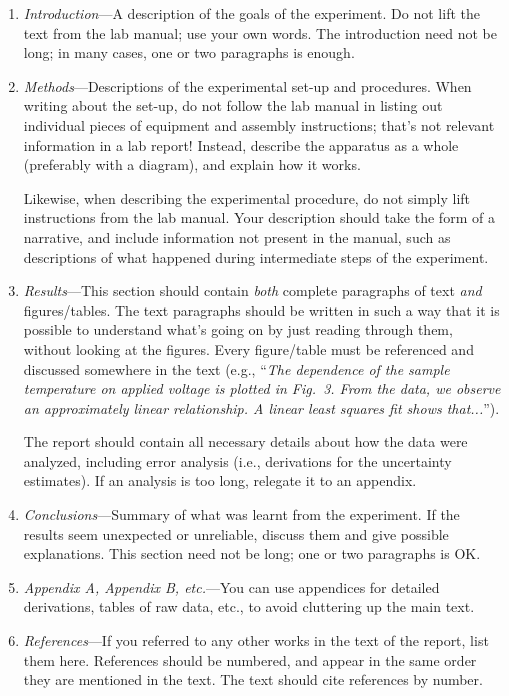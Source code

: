 \documentclass[11pt,a4paper]{article}
\begin{document}
\begin{enumerate}
\item \textit{Introduction}---A description of the goals of the
  experiment.  Do not lift the text from the lab manual; use your own
  words.  The introduction need not be long; in many cases, one or two
  paragraphs is enough.

\item \textit{Methods}---Descriptions of the experimental set-up and
  procedures.  When writing about the set-up, do not follow the lab
  manual in listing out individual pieces of equipment and assembly
  instructions; that's not relevant information in a lab report!
  Instead, describe the apparatus as a whole (preferably with a
  diagram), and explain how it works.

  Likewise, when describing the experimental procedure, do not simply
  lift instructions from the lab manual.  Your description should take
  the form of a narrative, and include information not present in the
  manual, such as descriptions of what happened during intermediate
  steps of the experiment.

\item \textit{Results}---This section should contain \textit{both}
  complete paragraphs of text \textit{and} figures/tables.  The text
  paragraphs should be written in such a way that it is possible to
  understand what's going on by just reading through them, without
  looking at the figures.  Every figure/table must be referenced and
  discussed somewhere in the text (e.g., ``\textit{The dependence of
    the sample temperature on applied voltage is plotted in Fig.~3.
    From the data, we observe an approximately linear relationship.  A
    linear least squares fit shows that...}'').

  The report should contain all necessary details about how the data
  were analyzed, including error analysis (i.e., derivations for the
  uncertainty estimates).  If an analysis is too long, relegate it to
  an appendix.

\item \textit{Conclusions}---Summary of what was learnt from the
  experiment.  If the results seem unexpected or unreliable, discuss
  them and give possible explanations.  This section need not be long;
  one or two paragraphs is OK.

\item \textit{Appendix A, Appendix B, etc.}---You can use appendices
  for detailed derivations, tables of raw data, etc., to avoid
  cluttering up the main text.

\item \textit{References}---If you referred to any other works in the
  text of the report, list them here.  References should be numbered,
  and appear in the same order they are mentioned in the text.  The
  text should cite references by number.
\end{enumerate}
\end{document}
